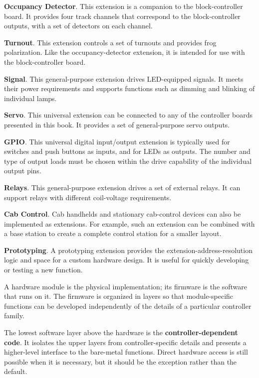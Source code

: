 \begin{smallGapItemize}
\item \textbf{Occupancy Detector}. This extension is a companion to the block-controller board. It provides four track channels that correspond to the block-controller outputs, with a set of detectors on each channel.
\item \textbf{Turnout}. This extension controls a set of turnouts and provides frog polarization. Like the occupancy-detector extension, it is intended for use with the block-controller board.
\item \textbf{Signal}. This general-purpose extension drives LED-equipped signals. It meets their power requirements and supports functions such as dimming and blinking of individual lamps.
\item \textbf{Servo}. This universal extension can be connected to any of the controller boards presented in this book. It provides a set of general-purpose servo outputs.
\item \textbf{GPIO}. This universal digital input/output extension is typically used for switches and push buttons as inputs, and for LEDs as outputs. The number and type of output loads must be chosen within the drive capability of the individual output pins.
\item \textbf{Relays}. This general-purpose extension drives a set of external relays. It can support relays with different coil-voltage requirements.
\item \textbf{Cab Control}. Cab handhelds and stationary cab-control devices can also be implemented as extensions. For example, such an extension can be combined with a base station to create a complete control station for a smaller layout.
\item \textbf{Prototyping}. A prototyping extension provides the extension-address-resolution logic and space for a custom hardware design. It is useful for quickly developing or testing a new function.
\end{smallGapItemize}


A hardware module is the physical implementation; its firmware is the software that runs on it. The firmware is organized in layers so that module-specific functions can be developed independently of the details of a particular controller family.

The lowest software layer above the hardware is the \textbf{controller-dependent code}. It isolates the upper layers from controller-specific details and presents a higher-level interface to the bare-metal functions. Direct hardware access is still possible when it is necessary, but it should be the exception rather than the default.

